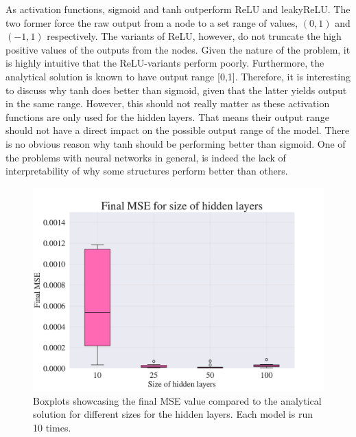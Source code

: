 As activation functions, sigmoid and tanh outperform ReLU and leakyReLU. 
The two former force the raw output from a node to a set range of values, $(0,1)$ and $(-1,1)$ respectively. 
The variants of ReLU, however, do not truncate the high positive values of the outputs from the nodes. 
Given the nature of the problem, it is highly intuitive that the ReLU-variants perform poorly. 
Furthermore, the analytical solution is known to have output range [0,1]. 
Therefore, it is interesting to discuss why tanh does better than sigmoid, given that the latter yields output in the same range. 
However, this should not really matter as these activation functions are only used for the hidden layers.
That means their output range should not have a direct impact on the possible output range of the model.
There is no obvious reason why tanh should be performing better than sigmoid.
One of the problems with neural networks in general, is indeed the lack of interpretability of why some structures perform better than others.


\begin{figure}[h!]
    \centering
    \includegraphics[width=1.0\linewidth]{project_3/plots/value_layers_search.pdf}
    \caption{Boxplots showcasing the final MSE value compared to the analytical solution for different sizes for the hidden layers. Each model is run 10 times. }
    \label{fig:boxplots_size_of_layers}
\end{figure}


